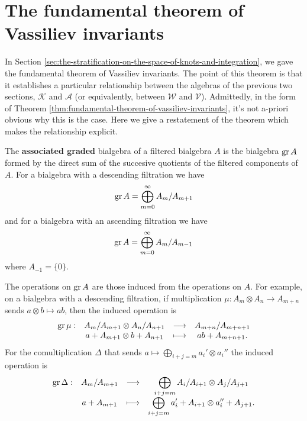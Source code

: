 \section{The fundamental theorem of Vassiliev invariants}
\label{sec:the-fundamental-theorem-of-vassiliev-invariants}

In Section \ref{sec:the-stratification-on-the-space-of-knots-and-integration}, we gave the fundamental theorem of Vassiliev invariants. The point of this theorem is that it establishes a particular relationship between the algebras of the previous two sections, \(\mathcal{K}\) and \(\mathcal{A}\) (or equivalently, between \(\mathcal{W}\) and \(\mathcal{V}\)). Admittedly, in the form of Theorem \ref{thm:fundamental-theorem-of-vassiliev-invariants}, it's not a-priori obvious why this is the case. Here we give a restatement of the theorem which makes the relationship explicit.

\begin{definition}
	The \textbf{associated graded} bialgebra of a filtered bialgebra \(A\) is the bialgebra \(\operatorname{gr} A\) formed by the direct sum of the succesive quotients of the filtered components of \(A\). For a bialgebra with a descending filtration we have
	\[\operatorname{gr} A = \bigoplus_{m = 0}^{\infty} A_{m} / A_{m + 1}\]
	and for a bialgebra with an ascending filtration we have
	\[\operatorname{gr} A = \bigoplus_{m = 0}^{\infty} A_{m} / A_{m - 1}\]
	where \(A_{-1} = \{0\}\).

	The operations on \(\operatorname{gr} A\) are those induced from the operations on \(A\). For example, on a bialgebra with a descending filtration, if multiplication \(\mu: A_{m} \otimes A_{n} \to A_{m + n}\) sends \(a \otimes b \mapsto ab\), then the induced operation is
	\[
		\begin{array}{rccc}
			\operatorname{gr} \mu:	&A_{m}/A_{m + 1} \otimes A_{n}/A_{n + 1}	&\longrightarrow	& A_{m + n}/A_{m + n + 1}\\
					& a + A_{m + 1} \otimes b + A_{n + 1}		&\longmapsto		& ab + A_{m + n + 1}.
		\end{array}
	\]
	For the comultiplication \(\Delta\) that sends \(a \mapsto \displaystyle\bigoplus_{i + j = m} a_{i}' \otimes a_{i}'' \) the induced operation is
	\[
		\begin{array}{rccc}
			\operatorname{gr} \Delta:	&A_{m}/A_{m + 1}	&\longrightarrow	& \displaystyle\bigoplus_{i + j = m} A_{i}/A_{i + 1} \otimes A_{j}/A_{j + 1}\\
					& a + A_{m + 1}		&\longmapsto		& \displaystyle\bigoplus_{i + j = m} a_{i}' + A_{i + 1} \otimes a_{i}'' + A_{j + 1}.
		\end{array}
	\]
\end{definition}

